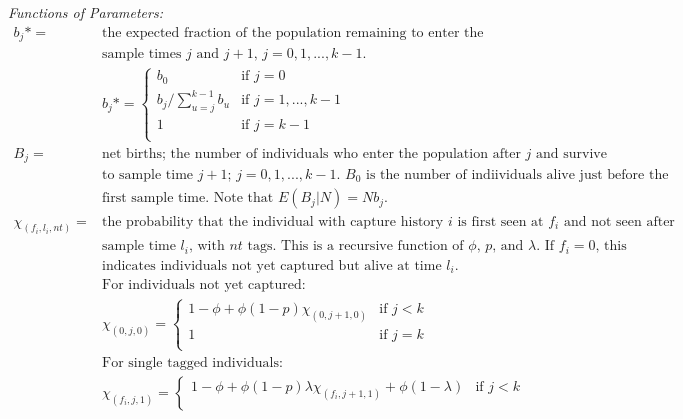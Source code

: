 \documentclass[]{article}
\begin{document}
\emph{Functions of Parameters:}\\
\[
  \begin{array}{ll}
    b_j*= & \text{the expected fraction of the population remaining to enter the population that enters between}\\
    & \text{sample times $j$ and $j+1$, $j=0,1,...,k-1$.}\\
       & b_{j}* = \left\{\begin{array}{ll}
                          b_0 & \text{if $j=0$} \\
                          b_j / \sum_{u=j}^{k-1} b_u & \text{if $j=1,...,k-1$}\\
                          1 & \text{if $j=k-1$} \\
                      \end{array}\right. \\
    B_j= & \text{net births; the number of individuals who enter the population after sample time $j$ and survive}\\
    & \text{to sample time $j+1$; $j=0,1,...,k-1$. $B_0$ is the number of indiividuals alive just before the}\\
    & \text{first sample time. Note that $E(B_j|N)=Nb_j$. }\\
    \chi_{(f_i,l_i,nt)}= & \text{the probability that the individual with capture history $i$ is first seen at $f_i$ and not seen after}\\
    & \text{sample time $l_i$, with $nt$ tags. This is a recursive function of $\phi$, $p$, and $\lambda$. If $f_i=0$, this}\\
    & \text{indicates individuals not yet captured but alive at time $l_i$.}\\
    & \text{For individuals not yet captured:}\\
       & \chi_{(0,j,0)} = \left\{\begin{array}{ll}
                          1-\phi+\phi(1-p)\chi_{(0,j+1,0)} & \text{if $j<k$} \\
                          1 & \text{if $j=k$}\\
                      \end{array}\right. \\
    & \text{For single tagged individuals:}\\
       & \chi_{(f_i,j,1)} = \left\{\begin{array}{ll}
                          1-\phi+\phi(1-p)\lambda \chi_{(f_i,j+1,1)}+\phi(1-\lambda) & \text{if $j<k$} \\

\end{array}
\end{array}\]
\end{document}

